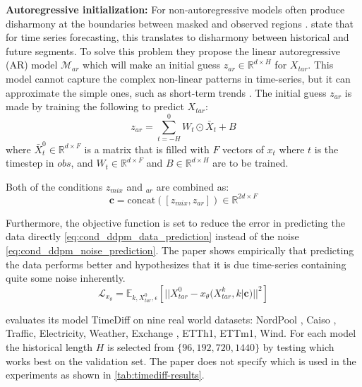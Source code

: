 \textbf{Autoregressive initialization:}
For non-autoregressive models often produce disharmony at the boundaries between masked and observed regions \cite{lugmayr_repaint_2022}. \textcite{shen_non-autoregressive_2023} state that for time series forecasting, this translates to disharmony between historical and future segments. To solve this problem they propose the linear autoregressive (AR) model $\mathcal{M}_{ar}$ which will make an initial guess $z_{ar} \in \mathbb{R}^{d \times H}$ for $X_{tar}$. This model cannot capture the complex non-linear patterns in time-series, but it can approximate the simple ones, such as short-term trends \cite{lai_modeling_2018}.
The initial guess $z_{ar}$ is made by training the following to predict $X_{tar}$:
\begin{equation}
    z_{ar} = \sum_{t=-H}^0 W_t \odot \bar{X}_t + B
\end{equation}
where $\bar{X}_t^0 \in \mathbb{R}^{d \times F}$ is a matrix that is filled with $F$ vectors of $x_t$ where $t$ is the timestep in $obs$, and $W_t \in \mathbb{R}^{d \times F}$ and $B \in \mathbb{R}^{d \times H}$ are to be trained.

Both of the conditions $z_{mix}$ and $_{ar}$ are combined as:
\begin{equation}
    \mathbf{c} = \text{concat}([z_{mix}, z_{ar}]) \in \mathbb{R}^{2d \times F}
\end{equation}

Furthermore, the objective function is set to reduce the error in predicting the data directly \eqref{eq:cond_ddpm_data_prediction} instead of the noise \eqref{eq:cond_ddpm_noise_prediction}. The paper shows empirically that predicting the data performs better and hypothesizes that it is due time-series containing quite some noise inherently.
\begin{equation}
    \mathcal{L}_{x_\theta} = \mathbb{E}_{k, X_{tar}^0, \epsilon} \left[|| X_{tar}^0 - x_\theta(X_{tar}^k, k | \mathbf{c})||^2 \right]
\end{equation}

\textcite{shen_non-autoregressive_2023} evaluates its model TimeDiff on nine real world datasets: NordPool \cite{nordpool_group_nordpool_2020}, Caiso \cite{energy_online_caiso_2012}, Traffic\cite{cuturi_pems-sf_2011}, Electricity\cite{trindade_electricityloaddiagrams20112014_2015}, Weather\cite{max-planck-institut_fuer_biogeochemie_weather_2008}, Exchange \cite{lai_modeling_2018}, ETTh1, ETTm1, Wind. For each model the historical length $H$ is selected from $\{96, 192, 720, 1440\}$ by testing which works best on the validation set. The paper does not specify which is used in the experiments as shown in \autoref{tab:timediff-results}.

